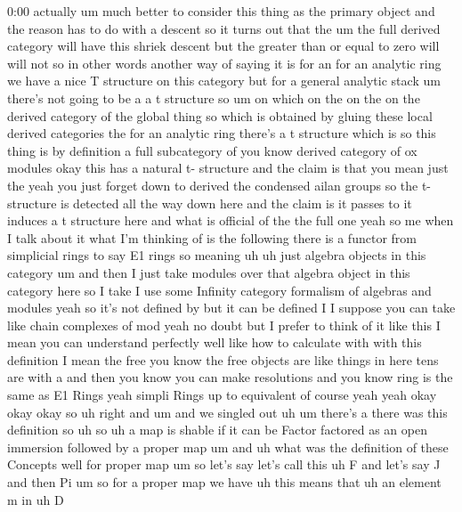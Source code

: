\begin{unfinished}{0:00}
actually  um  much  better  to  consider  this
thing  as  the  primary  object  and  the
reason  has  to  do  with  a  descent  so  it
turns  out  that  the  um  the  full  derived
category  will  have  this  shriek  descent
but  the  greater  than  or  equal  to  zero
will  will  not  so  in  other  words  another
way  of  saying  it  is  for  an  for  an
analytic  ring  we  have  a  nice  T  structure
on  this  category  but  for  a  general
analytic  stack
um  there's  not  going  to  be  a  a  t
structure  so  um  on  which  on  the  on  the
on  the  derived  category  of  the  global
thing  so  which  is  obtained  by  gluing
these  local  derived
categories  the  for  an  analytic  ring
there's  a  t  structure  which  is  so  this
thing  is  by  definition  a  full
subcategory  of  you  know  derived  category
of  ox  modules  okay  this  has  a  natural  t-
structure  and  the  claim  is  that  you  mean
just
the  yeah  you  just  forget  down  to  derived
the  condensed  ailan  groups  so  the  t-
structure  is  detected  all  the  way  down
here  and  the  claim  is  it  passes  to  it
induces  a  t  structure
here
and  what  is  official  of
the  the  full  one  yeah  so  me  when  I  talk
about  it  what  I'm  thinking  of  is  the
following  there  is  a  functor  from
simplicial  rings  to
say  E1  rings  so  meaning  uh  uh  just
algebra  objects  in  this
category  um  and  then  I  just  take  modules
over  that  algebra  object  in  this
category  here  so  I  take  I  use  some
Infinity  category  formalism  of  algebras
and
modules  yeah  so  it's  not  defined  by  but
it  can  be  defined  I  I  suppose  you  can
take  like  chain  complexes  of
mod  yeah  no  doubt  but  I  prefer  to  think
of  it  like  this  I  mean  you  can
understand  perfectly  well  like  how  to
calculate  with  with  this  definition  I
mean  the  free  you  know  the  free  objects
are  like  things  in  here  tens  are  with  a
and  then  you  know  you  can  make
resolutions  and  you
know  ring  is  the  same  as  E1  Rings  yeah
simpli  Rings  up  to  equivalent  of  course
yeah
yeah
okay
okay  okay  so  uh  right  and  um  and  we
singled  out
uh
um  there's  a  there  was  this
definition
so
uh
so  uh  a  map  is  shable  if  it  can  be
Factor  factored  as  an  open
immersion  followed  by  a  proper
map
um  and  uh  what  was  the  definition  of
these  Concepts  well  for  proper  map  um  so
let's  say  let's  call  this  uh  F  and  let's
say  J  and  then  Pi  um  so  for  a  proper  map
we  have  uh  this  means  that  uh  an  element
m
in  uh  D

\end{unfinished}
